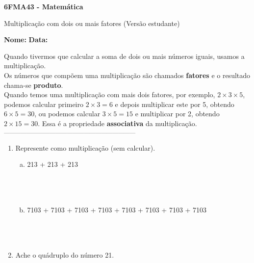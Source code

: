 \documentclass[a4paper,14pt]{article}
\begin{document}
	
	\noindent\textbf{6FMA43 - Matemática} 
	
	\begin{center}Multiplicação com dois ou mais fatores (Versão estudante)
	\end{center}
	
	\noindent\textbf{Nome:} \underline{\hspace{10cm}}
	\noindent\textbf{Data:} \underline{\hspace{4cm}}
	
	\begin{multicols}{2}
		\noindent Quando tivermos que calcular a soma de dois ou mais números iguais, usamos a multiplicação. \\
		Os números que compõem uma multiplicação são chamados \textbf{fatores} e o resultado chama-se \textbf{produto}. \\
		Quando temos uma multiplicação com mais dois fatores, por exemplo, $2 \times 3 \times 5$, podemos calcular primeiro $2 \times 3 = 6$ e depois multiplicar este por 5, obtendo $6 \times 5 = 30$, ou podemos calcular $3 \times 5 = 15$ e multiplicar por 2, obtendo $2 \times 15 = 30$. Essa é a propriedade \textbf{associativa} da multiplicação.
	\textsubscript{---------------------------------------------------------------------}
    	\begin{enumerate}
    		\item Represente como multiplicação (sem calcular).
    		\begin{enumerate}[a)]
    			\item 213 + 213 + 213 \\\\\\\\
    			\item 7103 + 7103 + 7103 + 7103 + 7103 + 7103 + 7103 + 7103 \\\\\\\\
    		\end{enumerate}
    		\item Ache o quádruplo do número 21. \\\\\\\\\\\\

\end{enumerate}
\end{multicols}
\end{document}
